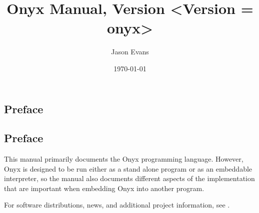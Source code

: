 \documentclass[10pt,titlepage]{book}
\title{Onyx Manual, Version <Version = onyx>}
\author{Jason Evans}
\date{\today}
\newcommand{\clearemptydoublepage}
	{\newpage \thispagestyle{empty} \cleardoublepage}
\begin{document}
\frontmatter
\pagestyle{plain}
\maketitle

\clearemptydoublepage
\begin{htmlonly}
\part*{Preface}
\end{htmlonly}
\begin{latexonly}
\chapter*{Preface}
\end{latexonly}

This manual primarily documents the Onyx programming language.  However, Onyx is
designed to be run either as a stand alone program or as an embeddable
interpreter, so the manual also documents different aspects of the
implementation that are important when embedding Onyx into another program.

For software distributions, news, and additional project information, see
.

\clearemptydoublepage
\tableofcontents
\begin{latexonly}
\listoftables
\end{latexonly}

%
%
\mainmatter

%
%
\renewcommand{\chaptermark}[1]{\markboth{#1}{}}
\renewcommand{\sectionmark}[1]{\markright{\thesection\ #1}}
\lhead[\bfseries\thepage]{\bfseries\rightmark}
\cfoot{}
\setlength{\headrulewidth}{2pt}
\pagestyle{fancy}
\end{document}

